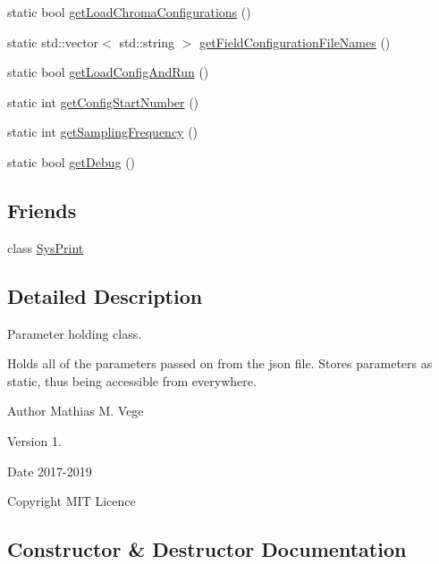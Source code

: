 \begin{DoxyCompactItemize}
\item 
static bool \mbox{\hyperlink{class_parameters_a35eef818713a6f5ae20d67e7d64bec2f}{get\+Load\+Chroma\+Configurations}} ()
\item 
static std\+::vector$<$ std\+::string $>$ \mbox{\hyperlink{class_parameters_a3ed137b5c7d4271b470df14ee2557004}{get\+Field\+Configuration\+File\+Names}} ()
\item 
static bool \mbox{\hyperlink{class_parameters_a7870fae41b172caee9fa020c86d056ac}{get\+Load\+Config\+And\+Run}} ()
\item 
static int \mbox{\hyperlink{class_parameters_a58f15668b37e705d34d6588e287e4bc0}{get\+Config\+Start\+Number}} ()
\item 
static int \mbox{\hyperlink{class_parameters_a3b4e197b2569fb5465e0827430e45eb5}{get\+Sampling\+Frequency}} ()
\item 
static bool \mbox{\hyperlink{class_parameters_a265e274127b6d845e43c66d94463f051}{get\+Debug}} ()
\end{DoxyCompactItemize}
\subsection*{Friends}
\begin{DoxyCompactItemize}
\item 
class \mbox{\hyperlink{class_parameters_aa0fdc1e103aea3a32f97ca2009dda3e6}{Sys\+Print}}
\end{DoxyCompactItemize}


\subsection{Detailed Description}
Parameter holding class. 

Holds all of the parameters passed on from the json file. Stores parameters as static, thus being accessible from everywhere.

\begin{DoxyAuthor}{Author}
Mathias M. Vege 
\end{DoxyAuthor}
\begin{DoxyVersion}{Version}
1. 
\end{DoxyVersion}
\begin{DoxyDate}{Date}
2017-\/2019 
\end{DoxyDate}
\begin{DoxyCopyright}{Copyright}
M\+IT Licence 
\end{DoxyCopyright}


\subsection{Constructor \& Destructor Documentation}
\mbox{\label{class_parameters_af4d94ee360ac0157d9065f78797fe9a1}} 
